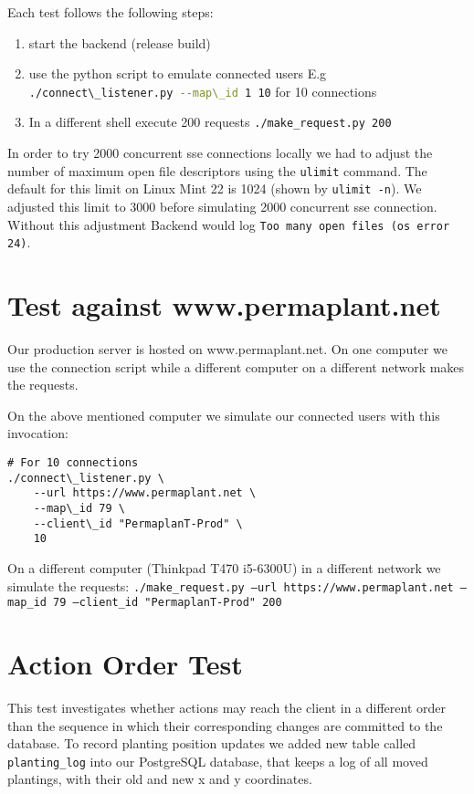 \documentclass[final,oneside]{vutinfth}
\newcommand{\bashsnippet}[1]{\lstinline[language=bash]{#1}}
\begin{document}
Each test follows the following steps:
\begin{enumerate}
    \item start the backend (release build)
    \item use the python script to emulate connected users
    E.g \bashsnippet{./connect\_listener.py --map\_id 1 10} for 10 connections
    \item In a different shell execute 200 requests \texttt{./make\_request.py 200}
\end{enumerate}

In order to try 2000 concurrent \gls{sse} connections locally we had to adjust the number of maximum open file descriptors using the \texttt{ulimit} command.
The default for this limit on Linux Mint 22 is 1024 (shown by \texttt{ulimit -n}).
We adjusted this limit to 3000 before simulating 2000 concurrent \gls{sse} connection.
Without this adjustment Backend would log \texttt{Too many open files (os error 24)}.

\section{Test against www.permaplant.net}

Our production server is hosted on www.permaplant.net.
On one computer we use the connection script while a different computer on a different network makes the requests.

On the above mentioned computer we simulate our connected users with this invocation: 
\begin{verbatim}
# For 10 connections
./connect\_listener.py \
    --url https://www.permaplant.net \
    --map\_id 79 \
    --client\_id "PermaplanT-Prod" \
    10 
\end{verbatim}

On a different computer (Thinkpad T470 i5-6300U) in a different network we simulate the requests:
\texttt{./make\_request.py --url https://www.permaplant.net --map\_id 79 --client\_id "PermaplanT-Prod" 200}

\section{Action Order Test}

This test investigates whether actions may reach the client in a different order than the sequence in which their corresponding changes are committed to the database.
To record planting position updates we added new table called \texttt{planting\_log} into our PostgreSQL database, that keeps a log of all moved plantings, with their old and new x and y coordinates.
\end{document}
